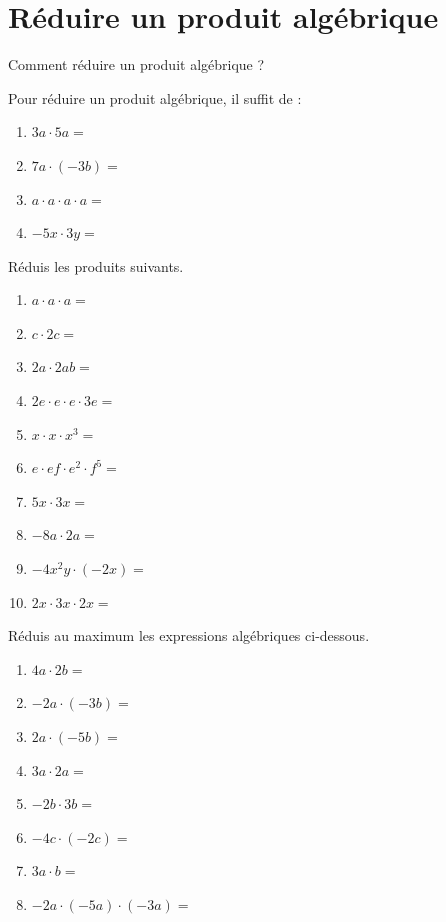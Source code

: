 \documentclass[../../syllabus_1.tex]{subfiles}
\begin{document}
\newpage
\section{Réduire un produit algébrique}
Comment réduire un produit algébrique ?

Pour réduire un produit algébrique, il suffit de :

\exemples
\begin{enumerate}[cols=2, itemsep=0.8cm, label=]
    \item \(3a\cdot 5a=\)
    \item \(7a \cdot (-3b)=\)
    \item \(a\cdot a\cdot a\cdot a=\)
    \item \(-5x\cdot 3y=\)
\end{enumerate}

\begin{exercise}
    Réduis les produits suivants.
    \begin{enumerate}[cols=2, itemsep=0.8cm]
        \item \(a \cdot a \cdot a =\)
        \item \(c \cdot 2c =\)
        \item \(2a \cdot 2ab =\)
        \item \(2e \cdot e \cdot e \cdot 3e =\)
        \item \(x \cdot x \cdot x^{3} =\)
        \item \(e \cdot ef \cdot e^{2} \cdot f^{5} =\)
        \item \(5x\cdot 3x=\)
        \item \(-8a\cdot 2a=\)
        \item \(-4x^2y \cdot (-2x)=\)
        \item \(2x\cdot 3x \cdot 2x=\)
    \end{enumerate}
\end{exercise}

\begin{exercise}
    Réduis au maximum les expressions algébriques ci-dessous.
    \begin{enumerate}[cols=2, itemsep=0.8cm]
        \item \(4a \cdot 2b =\)
        \item \(- 2a \cdot ( - 3b) =\)
        \item \(2a \cdot ( - 5b) =\)
        \item \(3a \cdot 2a =\)
        \item \(- 2b \cdot 3b =\)
        \item \(- 4c \cdot ( - 2c) =\)
        \item \(3a \cdot b =\)
        \item \(- 2a \cdot ( - 5a) \cdot ( - 3a) =\)
    \end{enumerate}
\end{exercise}
\end{document}
